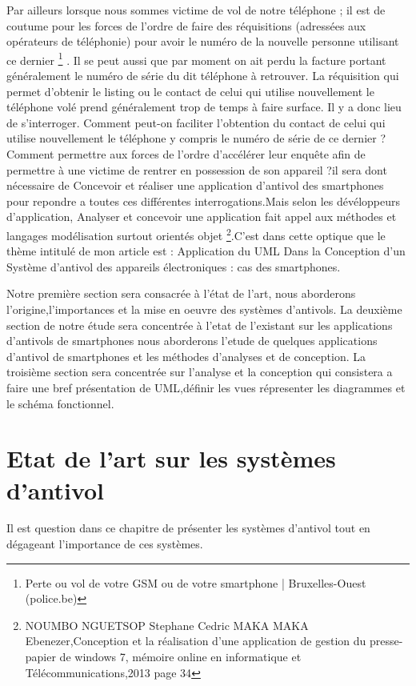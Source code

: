 \documentclass[a4paper, 12pt]{article}
\begin{document}
Par ailleurs lorsque nous sommes victime de vol de notre téléphone ; il est de coutume pour les forces de l’ordre de faire des réquisitions (adressées aux opérateurs de téléphonie) pour avoir le numéro de la nouvelle personne utilisant ce dernier \footnote{Perte ou vol de votre GSM ou de votre smartphone | Bruxelles-Ouest (police.be)} . Il se peut aussi que par moment on ait perdu la facture portant généralement le numéro de série du dit téléphone à retrouver. La réquisition
qui permet d’obtenir le listing ou le contact de celui qui utilise nouvellement le téléphone volé prend généralement trop de temps à faire surface. Il y a donc lieu de s’interroger. Comment peut-on faciliter l’obtention du contact de celui qui utilise nouvellement le téléphone y compris le numéro de série de ce dernier  ? Comment permettre aux forces de l’ordre d’accélérer leur enquête afin de permettre à une victime de rentrer en possession de son appareil ?il sera dont nécessaire de Concevoir et réaliser une application d’antivol  des smartphones pour repondre a toutes ces différentes interrogations.Mais selon les dévéloppeurs d'application, Analyser et concevoir une application fait appel aux méthodes et langages modélisation surtout orientés objet \footnote{NOUMBO NGUETSOP Stephane Cedric MAKA MAKA Ebenezer,Conception et la réalisation d'une application de gestion du presse-papier de windows 7, mémoire  online en informatique et Télécommunications,2013 page 34}.C'est dans cette optique que le thème intitulé de mon article est : Application du UML Dans la Conception d’un Système d’antivol des appareils électroniques : cas des smartphones.

\quad Notre première section sera consacrée à l’état de l’art, nous aborderons l'origine,l'importances et la mise en oeuvre des systèmes d'antivols. La deuxième section de notre étude sera concentrée à l'etat de l'existant sur les applications d'antivols de smartphones nous aborderons l'etude de quelques applications d'antivol de smartphones et les méthodes d'analyses et de conception. La troisième section sera concentrée sur l'analyse et la conception qui consistera a faire une bref présentation de UML,définir les vues répresenter  les diagrammes et le schéma fonctionnel. 



\newpage
\section{Etat de l'art sur les systèmes d'antivol}
Il est question dans ce chapitre de présenter les systèmes
d’antivol tout en dégageant l’importance de ces systèmes.
\end{document}
